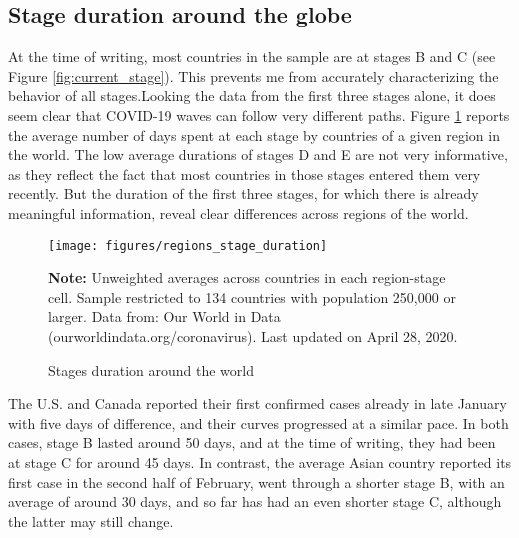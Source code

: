 \documentclass[12pt,english]{article}
\begin{document}
\subsection{Stage duration around the globe\label{subsec:Duration}}

At the time of writing, most countries in the sample are at stages B and C (see Figure \ref{fig:current_stage}). This prevents me from accurately characterizing the behavior of all stages.Looking the data from the first three stages alone, it does seem clear that COVID-19 waves can follow very different paths. Figure \ref{fig:stage_by_region} reports the average number of days spent at each stage by countries of a given region in the world. The low average durations of stages D and E are not very informative, as they reflect the fact that most countries in those stages entered them very recently. But the duration of the first three stages, for which there is already meaningful information, reveal clear differences across regions of the world.

\begin{figure}[H]
	\singlespacing
	\centering
	 \caption{Stages duration around the world}  \label{fig:stage_by_region}
	\resizebox{0.7\width}{!} {
		\begin{threeparttable}
 			  \texttt{[image: figures/regions\_stage\_duration]}
  			 \begin{tablenotes}[flushleft]\vspace*{-7bp}
			\item \textbf{Note:} Unweighted averages across countries in each region-stage cell. Sample restricted to 134 countries with population 250,000 or larger. Data from: Our World in Data (ourworldindata.org/coronavirus). Last updated on April 28, 2020.
			 \end{tablenotes}
  		\end{threeparttable}
 		}
  	 \onehalfspacing
\end{figure}

The U.S. and Canada reported their first confirmed cases already in late January with five days of difference, and their curves progressed at a similar pace. In both cases, stage B lasted around 50 days, and at the time of writing, they had been at stage C for around 45 days.  In contrast, the average Asian country reported its first case in the second half of February, went through a shorter stage B, with an average of around 30 days, and so far has had an even shorter stage C, although the latter may still change.
\end{document}
